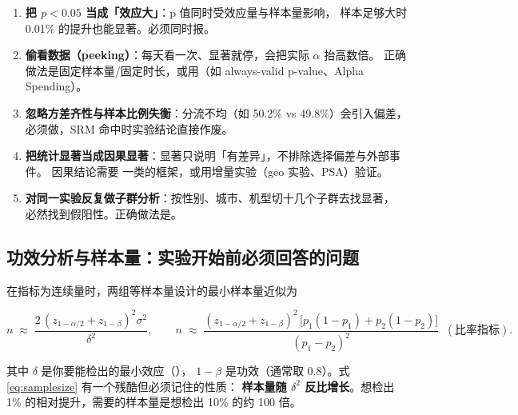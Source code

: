 \begin{pitfall}[p 值的五种典型误用]
\begin{enumerate}
  \item \textbf{把 $p<0.05$ 当成「效应大」}：p 值同时受效应量与样本量影响，
        样本足够大时 0.01\% 的提升也能显著。必须同时报。
  \item \textbf{偷看数据（peeking）}：每天看一次、显著就停，会把实际 $\alpha$ 抬高数倍。
        正确做法是固定样本量/固定时长，或用（如 always-valid p-value、Alpha Spending）。
  \item \textbf{忽略方差齐性与样本比例失衡}：分流不均（如 50.2\% vs 49.8\%）会引入偏差，
        必须做，SRM 命中时实验结论直接作废。
  \item \textbf{把统计显著当成因果显著}：显著只说明「有差异」，不排除选择偏差与外部事件。
        因果结论需要 \cite{pearl2009causality} 一类的框架，或用增量实验（geo 实验、PSA）验证。
  \item \textbf{对同一实验反复做子群分析}：按性别、城市、机型切十几个子群去找显著，
        必然找到假阳性。正确做法是。
\end{enumerate}
\end{pitfall}

\subsection{功效分析与样本量：实验开始前必须回答的问题}

在指标为连续量时，两组等样本量设计的最小样本量近似为

\begin{equation}
n \;\approx\; \frac{2\,(z_{1-\alpha/2} + z_{1-\beta})^2 \sigma^2}{\delta^2},
\qquad
n \;\approx\; \frac{(z_{1-\alpha/2}+z_{1-\beta})^2\,\big[p_1(1-p_1)+p_2(1-p_2)\big]}{(p_1-p_2)^2} \;\;(\text{比率指标}) .
\label{eq:samplesize}
\end{equation}

其中 $\delta$ 是你要能检出的最小效应（），
$1-\beta$ 是功效（通常取 0.8）。式 \cref{eq:samplesize} 有一个残酷但必须记住的性质：
\textbf{样本量随 $\delta^2$ 反比增长}。想检出 1\% 的相对提升，需要的样本量是想检出 10\% 的约 100 倍。

